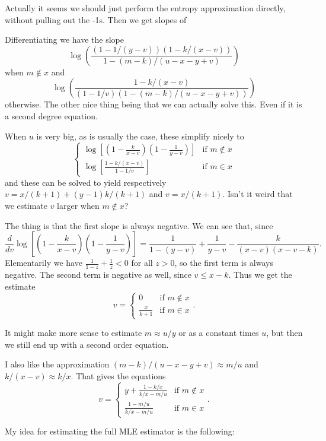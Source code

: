 Actually it seems we should just perform the entropy approximation directly, without pulling out the -1s. Then we get slopes of

Differentiating we have the slope
\[
   \log\left(\frac{(1-1/(y-v))(1-k/(x-v))}{1-(m-k)/(u-x-y+v)}\right)
\]
when $m\not\in x$ and 
\[
   \log\left(\frac{1-k/(x-v)}{(1-1/v)(1-(m-k)/(u-x-y+v))}\right)
\]
otherwise.
The other nice thing being that we can actually solve this.
Even if it is a second degree equation.

When $u$ is very big, as is usually the case, these simplify nicely to
\[
   \begin{cases}
      \log\left[(1-\frac{k}{x-v})(1-\frac1{y-v})\right]
      & \text{if } m\not\in x
      \\
      \log\left[\frac{1-k/(x-v)}{1-1/v}\right]
      & \text{if } m\in x
   \end{cases}
\]
and these can be solved to yield respectively
$v = x/(k+1) + (y-1)k/(k+1)$ and $v=x/(k+1)$.
Isn't it weird that we estimate $v$ larger when $m\not\in x$?

The thing is that the first slope is always negative.
We can see that, since
\[
   \frac{d}{dv}\log\left[(1-\frac{k}{x-v})(1-\frac1{y-v})\right]
   = \frac1{1-(y-v)} + \frac1{y-v} - \frac{k}{(x-v)(x-v-k)}.
\]
Elementarily we have $\frac{1}{1-z}+\frac{1}{z} < 0$ for all $z > 0$,
so the first term is always negative.
The second term is negative as well, since $v \le x-k$.
Thus we get the estimate
\[
   v = 
   \begin{cases}
      0 & \text{if } m\not\in x \\
      \frac{x}{k+1} & \text{if } m\in x
   \end{cases}
   .
\]

It might make more sense to estimate $m\approx u/y$ or as a constant times $u$, but then we still end up with a second order equation.

I also like the approximation $(m-k)/(u-x-y+v) \approx m/u$ and $k/(x-v)\approx k/x$.
That gives the equations
\[
   v = 
   \begin{cases}
      y + \frac{1-k/x}{k/x-m/u} & \text{if } m\not\in x \\
      \frac{1-m/u}{k/x - m/u} & \text{if } m\in x
   \end{cases}
   .
\]

My idea for estimating the full MLE estimator is the following:

